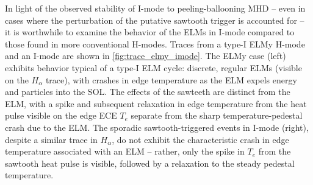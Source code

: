 \begin{figure}[!b]
 \pushtooutside
\end{figure}

In light of the observed stability of I-mode to peeling-ballooning MHD -- even in cases where the perturbation of the putative sawtooth trigger is accounted for -- it is worthwhile to examine the behavior of the ELMs in I-mode compared to those found in more conventional H-modes.  Traces from a type-I ELMy H-mode and an I-mode are shown in \cref{fig:trace_elmy_imode}.  The ELMy case (left) exhibits behavior typical of a type-I ELM cycle: discrete, regular ELMs (visible on the $H_\alpha$ trace), with crashes in edge temperature as the ELM expels energy and particles into the SOL.  The effects of the sawteeth are distinct from the ELM, with a spike and subsequent relaxation in edge temperature from the heat pulse visible on the edge ECE $T_e$ separate from the sharp temperature-pedestal crash due to the ELM.  The sporadic sawtooth-triggered events in I-mode (right), despite a similar trace in $H_\alpha$, do not exhibit the characteristic crash in edge temperature associated with an ELM -- rather, only the spike in $T_e$ from the sawtooth heat pulse is visible, followed by a relaxation to the steady pedestal temperature.

